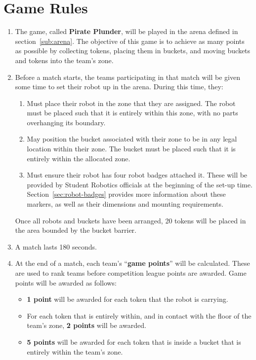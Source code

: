 \section {Game Rules}
\label{game-rules}

\begin{enumerate}
\item The game, called \textbf{Pirate Plunder}, will be played in the arena defined in section~\ref{sub:arena}.  The objective of this game is to achieve as many points as possible by collecting tokens, placing them in buckets, and moving buckets and tokens into the team's zone.

\item Before a match starts, the teams participating in that match will be given some time to set their robot up in the arena.  During this time, they:
\begin{enumerate}
  \item Must place their robot in the zone that they are assigned.  The robot must be placed such that it is entirely within this zone, with no parts overhanging its boundary.

  \item May position the bucket associated with their zone to be in any legal location within their zone.  The bucket must be placed such that it is entirely within the allocated zone.

  \item Must ensure their robot has four robot badges attached it.  These will be provided by Student Robotics officials at the beginning of the set-up time.  Section~\ref{sec:robot-badges} provides more information about these markers, as well as their dimensions and mounting requirements.
\end{enumerate}
Once all robots and buckets have been arranged, 20 tokens will be placed in the area bounded by the bucket barrier.

\item A match lasts 180 seconds.

\item At the end of a match, each team's ``\textbf{game points}'' will be calculated.
 These are used to rank teams before competition league points are awarded.  Game points will be awarded as follows:
\begin{itemize}
  \item \textbf{1 point} will be awarded for each token that the robot is carrying.
  \item For each token that is entirely within, and in contact with the floor of the team's zone, \textbf{2 points} will be awarded.
  \item \textbf{5 points} will be awarded for each token that is inside a bucket that is entirely within the team's zone.


\end{itemize}
\end{enumerate}
